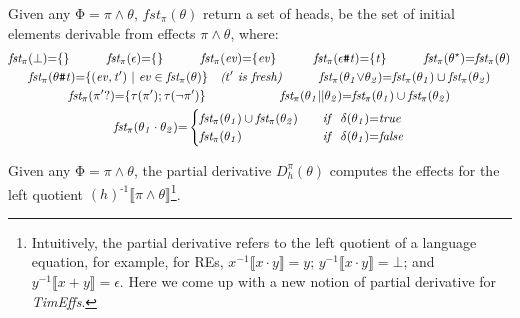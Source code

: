 \documentclass[acmsmall,10pt,review]{acmart}
\newcommand{\env}{\code{\mathcal{V}}}
\newcommand{\es}{\theta}
\newcommand{\ev}{ev}
\newcommand{\timedEffects}{\emph{TimEffs}}
\newcommand{\effect}{{\ensuremath{\mathrm{\Phi}}}}
\newcommand{\code}[1]{{\tt{\ensuremath{\m{#1}}}}}
\newcommand{\m}{\mathit}
\newcommand{\mysharp}{{\mathrel{\texttt{\#}}}}
\begin{document}
{\vspace{2mm}
\begin{definition}[First]\label{First}
  Given any \code{\effect {=} \pi \wedge \es},
  \code{fst_{{\pi}}(\es)} return a set of heads, be the set of initial elements   
  derivable from effects \code{\pi \wedge \es}, where: 
    { 
   \begin{gather*} 
  \code{fst_{{\pi}}( \bot ) {=} \{\} } \qquad\quad 
  \code{fst_{{\pi}}( \epsilon) {=}  \{\} } \qquad\quad
  \code{fst_{{\pi}}( \ev) {=} \{ \ev \}  }
  \qquad\quad
  \code{fst_{{\pi}}(  \epsilon \mysharp  t) {=}  \{ t \}}
  \qquad\quad
  \code{fst_{{\pi}}( {\es^\star} ) {=} fst_{{\pi}}({ \es})}
   \\
   \code{fst_{{\pi}}(\es \mysharp  t) {=}  \{(\ev, t^\prime) \ | \ \ev \in fst_{\pi}(\es) \}} 
   \ \ \  \emph{($t^\prime$\ is\ fresh)}
  \quad  
  \qquad
  \code{fst_{{\pi}}(  \es_1 {\vee} \es_2) {=} fst_{{\pi}}(  \es_1) \cup fst_{{\pi}}(  \es_2)  }  
  \\
  \code{fst_{{\pi}}( \pi^\prime? ) {=} \{\tau(\pi^\prime); \tau(\neg \pi^\prime)\}  }
      \qquad\qquad\qquad 
     \code{fst_{{\pi}}(  \es_1 {||} \es_2) {=} fst_{{\pi}}(  \es_1) \cup fst_{{\pi}}(  \es_2)  }   
     \\
  {
  \code{fst_{{\pi}}(\es_1 \cdot \es_2) {=} } 
  \begin{cases}
        \code{\code{fst_{{\pi}}(  \es_1)} \cup \code{fst_{{\pi}}(  \es_2)} } \quad   & \code{ if\ \  \delta(\es_1) {=} true}\\
        \code{\code{fst_{{\pi}}(  \es_1)}} & \code{  if\ \  \delta(\es_1) {=} false}
      \end{cases} 
      }  
  \end{gather*}
  }
\end{definition}

\begin{comment}
  \begin{definition}[Heads Subsumption]\label{Subsumption1}
Given two time instances \code{(I, \pi_1, t_1)} and \code{(J, \pi_2, t_2)}, we define the subset relation \code{(I, \pi_1, t_1) {\subseteq} (J, \pi_2, t_2)} as:  \code{I {\subseteq} J} and \code{\pi_1[t_2/t_1]  {\Rightarrow}   \pi_2  }.

\end{definition}
\end{comment}


\vspace{2mm}
\begin{definition}\label{Derivative}
  Given any \code{\effect {=}\pi \wedge  \es}, 
  the partial derivative \code{D^{\pi}_{h}( \es)} 
   computes the  effects for the 
  left quotient \code{(h)^{\text{-}1}\llbracket \pi \wedge \es 
  \rrbracket}\footnote{Intuitively, the partial derivative refers to the left quotient of a language equation, for example, for REs, \code{x^{{-}1} \llbracket x\cdot y\rrbracket {=} y};  \code{y^{{-}1} \llbracket x\cdot y\rrbracket {=} \bot }; and  \code{y^{{-}1} \llbracket x + y\rrbracket {=} \epsilon}. Here we come up with a new notion of partial derivative for \timedEffects. 
  }. 


\end{definition}}
\end{document}
